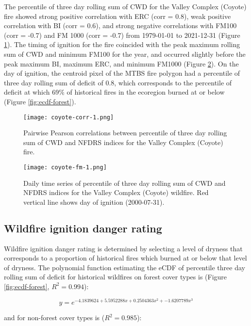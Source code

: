 \documentclass[11p]{article}
\begin{document}
The percentile of three day rolling sum of CWD for the Valley Complex (Coyote) fire showed strong positive correlation with ERC (corr = 0.8), weak positive correlation with BI (corr = 0.6), and strong negative correlations with FM100 (corr = -0.7) and FM 1000 (corr = -0.7) from 1979-01-01 to 2021-12-31 (Figure \ref{fig:coyote-corrplot}). The timing of ignition for the fire coincided with the peak maximum rolling sum of CWD and minimum FM100 for the year, and occurred slightly before the peak maximum BI, maximum ERC, and minimum FM1000 (Figure \ref{fig:coyote-fm}). On the day of ignition, the centroid pixel of the MTBS fire polygon had a percentile of three day rolling sum of deficit of 0.8, which corresponds to the percentile of deficit at which 69\% of historical fires in the ecoregion burned at or below (Figure \ref{fig:ecdf-forest}).

\begin{figure}[htbp]
  \centering
  \texttt{[image: coyote-corr-1.png]}
  \caption{Pairwise Pearson correlations between percentile of three day rolling sum of CWD and NFDRS indices for the Valley Complex (Coyote) fire.}
  \label{fig:coyote-corrplot}
\end{figure}


\begin{figure}[htbp]
  \centering
  \texttt{[image: coyote-fm-1.png]}
  \caption{Daily time series of percentile of three day rolling sum of CWD and NFDRS indices for the Valley Complex (Coyote) wildfire. Red vertical line shows day of ignition (2000-07-31).}
  \label{fig:coyote-fm}
\end{figure}

\subsection{Wildfire ignition danger rating}

Wildfire ignition danger rating is determined by selecting a level of dryness that corresponds to a proportion of historical fires which burned at or below that level of dryness. The polynomial function estimating the eCDF of percentile three day rolling sum of deficit for historical wildfires on forest cover types is (Figure \ref{fig:ecdf-forest}, $R^2 = 0.994$):

\begin{equation*}
  y = e^{-4.1839624 + 5.5952288x + 0.2504363x^2 + -1.6207789x^3}
\end{equation*}

and for non-forest cover types is ($R^2=0.985$):
\end{document}
